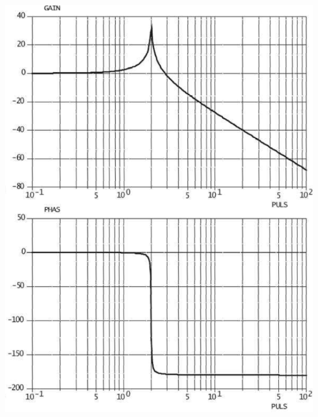 \documentclass[10pt,fleqn]{article} %
\begin{document}
\begin{multicols}{2}
\begin{center}
\includegraphics[width=\linewidth]{images/img_05}
\end{center}


\end{multicols}
\end{document}
